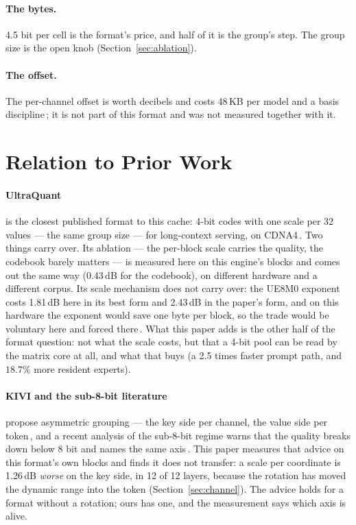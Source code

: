 \documentclass[10pt,twocolumn]{article}
\begin{document}
\paragraph{The bytes.} 4.5 bit per cell is the format's price, and half of it is the group's step. The
group size is the open knob (Section~\ref{sec:ablation}).

\paragraph{The offset.} The per-channel offset is worth decibels and costs 48\,KB per model and a basis
discipline\,\cite{shear}; it is not part of this format and was not measured together with it.

\section{Relation to Prior Work}

\paragraph{UltraQuant} is the closest published format to this cache: 4-bit codes with one scale per 32
values --- the same group size --- for long-context serving, on CDNA4\,\cite{ultraquant}. Two things carry
over. Its ablation --- the per-block scale carries the quality, the codebook barely matters --- is measured
here on this engine's blocks and comes out the same way (0.43\,dB for the codebook), on different hardware
and a different corpus. Its scale mechanism does not carry over: the UE8M0 exponent costs 1.81\,dB here
in its best form and 2.43\,dB in the paper's form, and on this hardware the exponent would save one byte
per block, so the trade would be voluntary here and forced there\,\cite{shear}. What this paper adds is the
other half of the format question: not what the scale costs, but that a 4-bit pool can be read by the
matrix core at all, and what that buys (a 2.5 times faster prompt path, and $18.7\%$ more resident
experts).

\paragraph{KIVI and the sub-8-bit literature} propose asymmetric grouping --- the key side per channel, the
value side per token\,\cite{kivi}, and a recent analysis of the sub-8-bit regime warns that the quality
breaks down below 8 bit and names the same axis\,\cite{zinc}. This paper measures that advice on this
format's own blocks and finds it does not transfer: a scale per coordinate is 1.26\,dB \emph{worse} on the
key side, in 12 of 12 layers, because the rotation has moved the dynamic range into the token
(Section~\ref{sec:channel}). The advice holds for a format without a rotation; ours has one, and the
measurement says which axis is alive.
\end{document}
